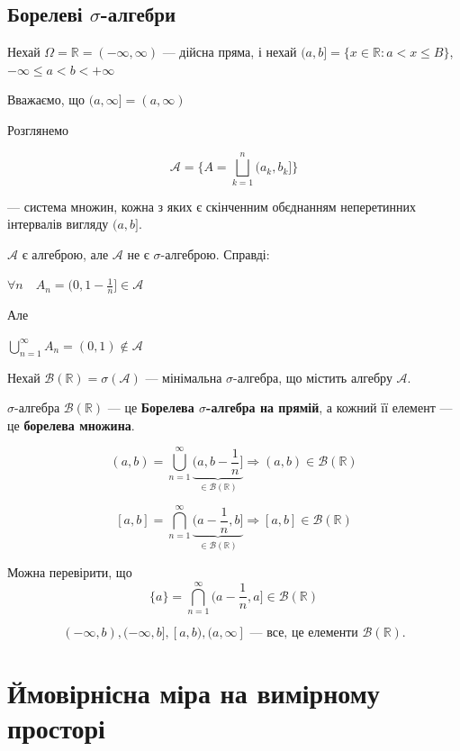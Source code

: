 \subsection[Борелеві сигма-алгебри]{Борелеві $\sigma$-алгебри}

Нехай $\Omega = \mathbb{R} = (-\infty, \infty)$ --- дійсна
пряма, і нехай $(a, b] = \{x \in \mathbb{R}: a < x \leqslant B\}$,
$-\infty \leqslant a < b < + \infty$

Вважаємо, що $(a, \infty] = (a, \infty)$

Розглянемо 

$$\mathcal{A} = \{A = \bigsqcup\limits_{k = 1}^n (a_k, b_k]\}$$

--- система множин, кожна з яких є скінченним обєднанням 
неперетинних інтервалів вигляду $(a, b]$.

$\mathcal{A}$ є алгеброю, але $\mathcal{A}$ не є $\sigma$-алгеброю.
Справді:

$\forall n \quad A_n = (0, 1 - \frac{1}{n}] \in \mathcal{A}$

Але 

$\bigcup\limits_{n=1}^{\infty} A_n = (0, 1) \notin \mathcal{A}$

Нехай $\mathcal{B}(\mathbb{R}) = \sigma(\mathcal{A})$ --- мінімальна
$\sigma$-алгебра, що містить алгебру $\mathcal{A}$.

\begin{definition}
    $\sigma$-алгебра $\mathcal{B}(\mathbb{R})$ --- це \textbf{Борелева $\sigma$-алгебра на прямій},
    а кожний її елемент --- це \textbf{борелева множина}.
\end{definition}

\begin{remark}
    $$(a, b) = \bigcup\limits_{n=1}^{\infty} \underbrace{(a, b - \frac{1}{n}]}_{\in \mathcal{B}(\mathbb{R})} \Rightarrow
    (a, b) \in \mathcal{B}(\mathbb{R})$$

    $$[a, b] = \bigcap\limits_{n=1}^{\infty} \underbrace{(a - \frac{1}{n}, b]}_{\in \mathcal{B}(\mathbb{R})} \Rightarrow
    [a, b] \in \mathcal{B}(\mathbb{R})$$
    
    Можна перевірити, що
    $$\{a\} = \bigcap\limits_{n=1}^{\infty} (a - \frac{1}{n}, a] \in \mathcal{B}(\mathbb{R})$$

    $$(-\infty, b), (-\infty, b], [a, b), (a, \infty] \text{ --- все, це елементи } \mathcal{B}(\mathbb{R}).$$
\end{remark}

\section{Ймовірнісна міра на вимірному просторі}

